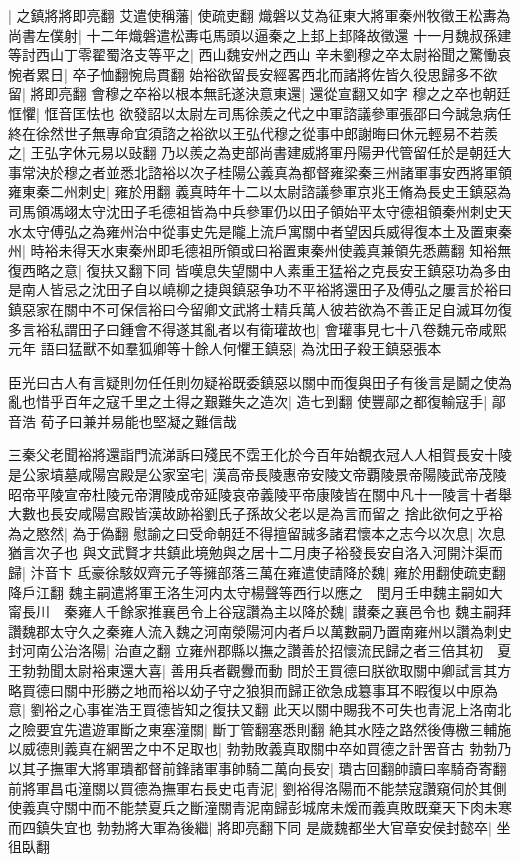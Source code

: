 |{
	之鎮將將即亮翻}
艾遣使稱藩|{
	使疏吏翻}
熾磐以艾為征東大將軍秦州牧徵王松夀為尚書左僕射|{
	十二年熾磐遣松夀屯馬頭以逼秦之上邽上邽降故徵還}
十一月魏叔孫建等討西山丁零翟蜀洛支等平之|{
	西山魏安州之西山}
辛未劉穆之卒太尉裕聞之驚慟哀惋者累日|{
	卒子恤翻惋烏貫翻}
始裕欲留長安經畧西北而諸將佐皆久役思歸多不欲留|{
	將即亮翻}
會穆之卒裕以根本無託遂決意東還|{
	還從宣翻又如字}
穆之之卒也朝廷恇懼|{
	恇音匡怯也}
欲發詔以太尉左司馬徐羨之代之中軍諮議參軍張邵曰今誠急病任終在徐然世子無專命宜須諮之裕欲以王弘代穆之從事中郎謝晦曰休元輕易不若羨之|{
	王弘字休元易以䜴翻}
乃以羨之為吏部尚書建威將軍丹陽尹代管留任於是朝廷大事常決於穆之者並悉北諮裕以次子桂陽公義真為都督雍梁秦三州諸軍事安西將軍領雍東秦二州刺史|{
	雍於用翻}
義真時年十二以太尉諮議參軍京兆王脩為長史王鎮惡為司馬領馮翊太守沈田子毛德祖皆為中兵參軍仍以田子領始平太守德祖領秦州刺史天水太守傅弘之為雍州治中從事史先是隴上流戶寓關中者望因兵威得復本土及置東秦州|{
	時裕未得天水東秦州即毛德祖所領或曰裕置東秦州使義真兼領先悉薦翻}
知裕無復西略之意|{
	復扶又翻下同}
皆嘆息失望關中人素重王猛裕之克長安王鎮惡功為多由是南人皆忌之沈田子自以嶢柳之捷與鎮惡争功不平裕將還田子及傅弘之屢言於裕曰鎮惡家在關中不可保信裕曰今留卿文武將士精兵萬人彼若欲為不善正足自滅耳勿復多言裕私謂田子曰鍾會不得遂其亂者以有衛瓘故也|{
	會瓘事見七十八卷魏元帝咸熙元年}
語曰猛獸不如羣狐卿等十餘人何懼王鎮惡|{
	為沈田子殺王鎮惡張本}


臣光曰古人有言疑則勿任任則勿疑裕既委鎮惡以關中而復與田子有後言是鬬之使為亂也惜乎百年之寇千里之土得之艱難失之造次|{
	造七到翻}
使豐鄗之都復輸寇手|{
	鄗音浩}
荀子曰兼并易能也堅凝之難信哉

三秦父老聞裕將還詣門流涕訴曰殘民不霑王化於今百年始覩衣冠人人相賀長安十陵是公家墳墓咸陽宫殿是公家室宅|{
	漢高帝長陵惠帝安陵文帝覇陵景帝陽陵武帝茂陵昭帝平陵宣帝杜陵元帝渭陵成帝延陵哀帝義陵平帝康陵皆在關中凡十一陵言十者舉大數也長安咸陽宫殿皆漢故跡裕劉氏子孫故父老以是為言而留之}
捨此欲何之乎裕為之愍然|{
	為于偽翻}
慰諭之曰受命朝廷不得擅留誠多諸君懷本之志今以次息|{
	次息猶言次子也}
與文武賢才共鎮此境勉與之居十二月庚子裕發長安自洛入河開汴渠而歸|{
	汴音卞}
氐豪徐駭奴齊元子等擁部落三萬在雍遣使請降於魏|{
	雍於用翻使疏吏翻降戶江翻}
魏主嗣遣將軍王洛生河内太守楊聲等西行以應之　閏月壬申魏主嗣如大甯長川　秦雍人千餘家推襄邑令上谷寇讚為主以降於魏|{
	讃秦之襄邑令也}
魏主嗣拜讚魏郡太守久之秦雍人流入魏之河南滎陽河内者戶以萬數嗣乃置南雍州以讚為刺史封河南公治洛陽|{
	治直之翻}
立雍州郡縣以撫之讚善於招懷流民歸之者三倍其初　夏王勃勃聞太尉裕東還大喜|{
	善用兵者觀釁而動}
問於王買德曰朕欲取關中卿試言其方略買德曰關中形勝之地而裕以幼子守之狼狽而歸正欲急成簒事耳不暇復以中原為意|{
	劉裕之心事崔浩王買德皆知之復扶又翻}
此天以關中賜我不可失也青泥上洛南北之險要宜先遣遊軍斷之東塞潼關|{
	斷丁管翻塞悉則翻}
絶其水陸之路然後傳檄三輔施以威德則義真在網罟之中不足取也|{
	勃勃敗義真取關中卒如買德之計罟音古}
勃勃乃以其子撫軍大將軍璝都督前鋒諸軍事帥騎二萬向長安|{
	璝古回翻帥讀曰率騎奇寄翻}
前將軍昌屯潼關以買德為撫軍右長史屯青泥|{
	劉裕得洛陽而不能禁寇讚窺伺於其側使義真守關中而不能禁夏兵之斷潼關青泥南歸彭城席未煖而義真敗既棄天下肉未寒而四鎮失宜也}
勃勃將大軍為後繼|{
	將即亮翻下同}
是歲魏都坐大官章安侯封懿卒|{
	坐徂臥翻}


